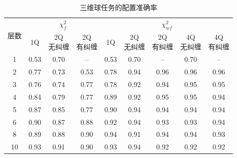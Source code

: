 \documentclass[a4paper]{ctexart}
\begin{document}
\begin{table}[H]
    \centering
    \caption{三维球任务的配置准确率}
    \renewcommand{\arraystretch}{1.2}
    \begin{tabular}{@{}c*{8}{c}@{}}
        \toprule
        \multirow{2}{*}{层数} & \multicolumn{3}{c}{$\chi_f^2$} & \multicolumn{5}{c}{$\chi_{wf}^2$}                                           \\
        \cmidrule(lr){2-4}\cmidrule(lr){5-9}
                            & 1Q                             & \shortstack{2Q                                                              \\无纠缠} & \shortstack{2Q\\有纠缠} & 1Q & \shortstack{2Q\\无纠缠} & \shortstack{2Q\\有纠缠} & \shortstack{4Q\\无纠缠} & \shortstack{4Q\\有纠缠} \\
        \midrule
        1                   & 0.53                           & 0.70                              & --   & 0.53 & 0.70 & --   & 0.70 & --   \\
        2                   & 0.77                           & 0.73                              & 0.53 & 0.78 & 0.94 & 0.96 & 0.96 & 0.96 \\
        3                   & 0.76                           & 0.74                              & 0.77 & 0.78 & 0.92 & 0.94 & 0.95 & 0.95 \\
        4                   & 0.84                           & 0.79                              & 0.77 & 0.89 & 0.92 & 0.95 & 0.95 & 0.94 \\
        5                   & 0.87                           & 0.85                              & 0.77 & 0.90 & 0.94 & 0.94 & 0.94 & 0.94 \\
        6                   & 0.90                           & 0.87                              & 0.88 & 0.92 & 0.94 & 0.93 & 0.93 & 0.94 \\
        8                   & 0.89                           & 0.88                              & 0.90 & 0.94 & 0.91 & 0.94 & 0.94 & 0.93 \\
        10                  & 0.93                           & 0.91                              & 0.90 & 0.93 & 0.94 & 0.92 & 0.92 & 0.92 \\
        \bottomrule
    \end{tabular}
\end{table}
\end{document}

